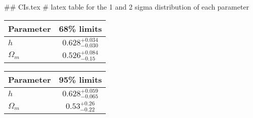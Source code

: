 ## CIs.tex
# latex table for the 1 and 2 sigma distribution of each parameter

\begin{tabular} { l  c}
 Parameter &  68\% limits\\
\hline
{\boldmath$h              $} & $0.628^{+0.034}_{-0.030}   $\\
{\boldmath$\Omega_m       $} & $0.526^{+0.084}_{-0.15}    $\\
\hline
\end{tabular}

\begin{tabular} { l  c}
 Parameter &  95\% limits\\
\hline
{\boldmath$h              $} & $0.628^{+0.059}_{-0.065}   $\\
{\boldmath$\Omega_m       $} & $0.53^{+0.26}_{-0.22}      $\\
\hline
\end{tabular}
